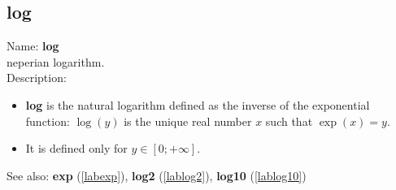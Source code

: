 \subsection{log}
\label{lablog}
\noindent Name: \textbf{log}\\
neperian logarithm.\\

\noindent Description: \begin{itemize}

\item \textbf{log} is the natural logarithm defined as the inverse of the exponential
   function: $\log(y)$ is the unique real number $x$ such that $\exp(x)=y$.

\item It is defined only for $y \in [0; +\infty]$.
\end{itemize}
See also: \textbf{exp} (\ref{labexp}), \textbf{log2} (\ref{lablog2}), \textbf{log10} (\ref{lablog10})
